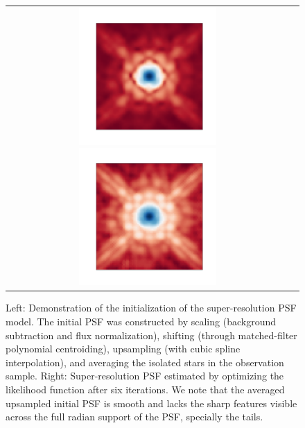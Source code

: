 \begin{figure}
 \begin{tabular}{cc}
\includegraphics[width=0.5\textwidth]{figures/wfc3ir/super0.png}
\includegraphics[width=0.5\textwidth]{figures/wfc3ir/super2.png}
\end{tabular}
\caption{\label{fig:srpsf} Left: Demonstration of the initialization of the super-resolution PSF model. The initial PSF was constructed by scaling (background subtraction and flux normalization), shifting (through matched-filter polynomial centroiding), upsampling (with cubic spline interpolation), and averaging the isolated stars in the observation sample. 
Right: Super-resolution PSF estimated by optimizing the likelihood function after six iterations. We note that the averaged upsampled initial PSF is smooth and lacks the sharp features visible across the full radian support of the PSF, specially the tails.}
\end{figure}

